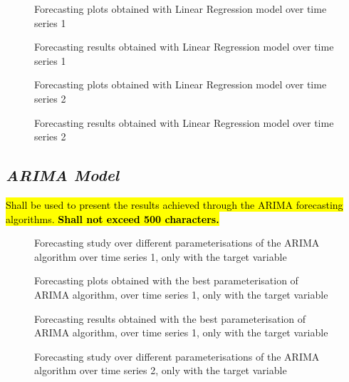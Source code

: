 \documentclass[10pt]{extarticle}
\newcommand{\ctext}[3][RGB]{%
  \begingroup
  \definecolor{hlcolor}{#1}{#2}\sethlcolor{hlcolor}%
  \hl{#3}%
  \endgroup
}
\begin{document}
\begin{figure}[H]
\caption{Forecasting plots obtained with Linear Regression model over time series 1}
\end{figure}

\begin{figure}[H]
\caption{Forecasting results obtained with Linear Regression model over time series 1}
\end{figure}

\begin{figure}[H]
\caption{Forecasting plots obtained with Linear Regression model over time series 2}
\end{figure}

\begin{figure}[H]
\caption{Forecasting results obtained with Linear Regression model over time series 2}
\end{figure}

\subsection*{\textit{ARIMA Model}}
\ctext[RGB]{190,190,190}{Shall be used to present the results achieved through the ARIMA forecasting algorithms.  \textbf{Shall not exceed 500 characters.}}

\begin{figure}[H]
\caption{Forecasting study over different parameterisations of the ARIMA algorithm over time series 1, only with the target variable}
\end{figure}

\begin{figure}[H]
\caption{Forecasting plots obtained with the best parameterisation of ARIMA algorithm, over time series 1, only with the target variable}
\end{figure}

\begin{figure}[H]
\caption{Forecasting results obtained with the best parameterisation of ARIMA algorithm, over time series 1, only with the target variable}
\end{figure}

\begin{figure}[H]
\caption{Forecasting study over different parameterisations of the ARIMA algorithm over time series 2, only with the target variable}
\end{figure}
\end{document}
